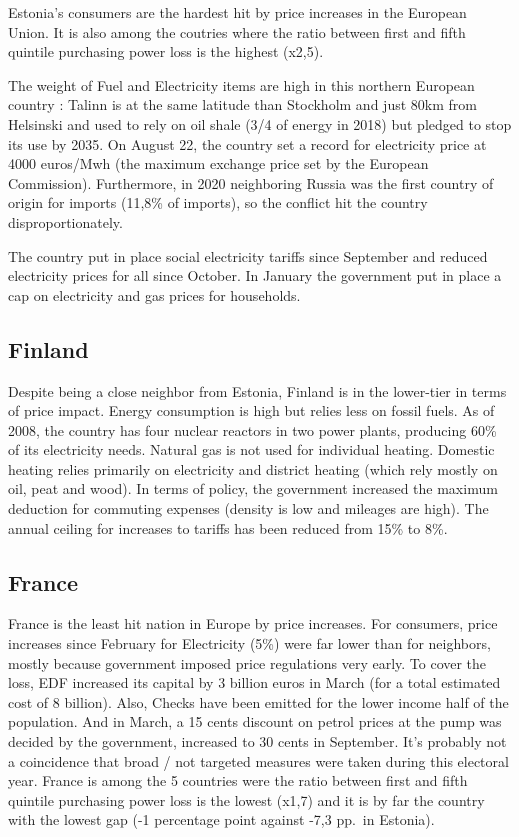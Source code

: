 \documentclass[
  9pt,
  a4paper,
  numbers=noendperiod,
  DIV=12]{scrartcl}
\begin{document}
Estonia's consumers are the hardest hit by price increases in the
European Union. It is also among the coutries where the ratio between
first and fifth quintile purchasing power loss is the highest (x2,5).

The weight of Fuel and Electricity items are high in this northern
European country : Talinn is at the same latitude than Stockholm and
just 80km from Helsinski and used to rely on oil shale (3/4 of energy in
2018) but pledged to stop its use by 2035. On August 22, the country set
a record for electricity price at 4000 euros/Mwh (the maximum exchange
price set by the European Commission). Furthermore, in 2020 neighboring
Russia was the first country of origin for imports (11,8\% of imports),
so the conflict hit the country disproportionately.

The country put in place social electricity tariffs since September and
reduced electricity prices for all since October. In January the
government put in place a cap on electricity and gas prices for
households.

\hypertarget{finland}{%
\subsection{Finland}\label{finland}}

Despite being a close neighbor from Estonia, Finland is in the
lower-tier in terms of price impact. Energy consumption is high but
relies less on fossil fuels. As of 2008, the country has four nuclear
reactors in two power plants, producing 60\% of its electricity needs.
Natural gas is not used for individual heating. Domestic heating relies
primarily on electricity and district heating (which rely mostly on oil,
peat and wood). In terms of policy, the government increased the maximum
deduction for commuting expenses (density is low and mileages are high).
The annual ceiling for increases to tariffs has been reduced from 15\%
to 8\%.

\hypertarget{france}{%
\subsection{France}\label{france}}

France is the least hit nation in Europe by price increases. For
consumers, price increases since February for Electricity (5\%) were far
lower than for neighbors, mostly because government imposed price
regulations very early. To cover the loss, EDF increased its capital by
3 billion euros in March (for a total estimated cost of 8 billion).
Also, Checks have been emitted for the lower income half of the
population. And in March, a 15 cents discount on petrol prices at the
pump was decided by the government, increased to 30 cents in September.
It's probably not a coincidence that broad / not targeted measures were
taken during this electoral year. France is among the 5 countries were
the ratio between first and fifth quintile purchasing power loss is the
lowest (x1,7) and it is by far the country with the lowest gap (-1
percentage point against -7,3 pp.~in Estonia).
\end{document}
